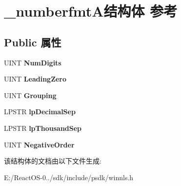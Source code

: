 \hypertarget{struct__numberfmt_a}{}\section{\+\_\+numberfmt\+A结构体 参考}
\label{struct__numberfmt_a}
\subsection*{Public 属性}
\begin{DoxyCompactItemize}
\item 
\mbox{\label{struct__numberfmt_a_ad3dfe2b31f89dbb4c11befe2ef4ba4c5}} 
U\+I\+NT {\bfseries Num\+Digits}
\item 
\mbox{\label{struct__numberfmt_a_a077796b163887e98ecaf2b538259d1b3}} 
U\+I\+NT {\bfseries Leading\+Zero}
\item 
\mbox{\label{struct__numberfmt_a_a9fe70eeef3c892e5fd17a61c6974f2b9}} 
U\+I\+NT {\bfseries Grouping}
\item 
\mbox{\label{struct__numberfmt_a_a32e4f702c835067ec046474f99232b87}} 
L\+P\+S\+TR {\bfseries lp\+Decimal\+Sep}
\item 
\mbox{\label{struct__numberfmt_a_a9f3216e9c63da92852bf16d4cd1d36a7}} 
L\+P\+S\+TR {\bfseries lp\+Thousand\+Sep}
\item 
\mbox{\label{struct__numberfmt_a_a2abaeb0aca0eb05647604c6a53fe11c3}} 
U\+I\+NT {\bfseries Negative\+Order}
\end{DoxyCompactItemize}


该结构体的文档由以下文件生成\+:\begin{DoxyCompactItemize}
\item 
E\+:/\+React\+O\+S-\/0../sdk/include/psdk/winnls.\+h\end{DoxyCompactItemize}
